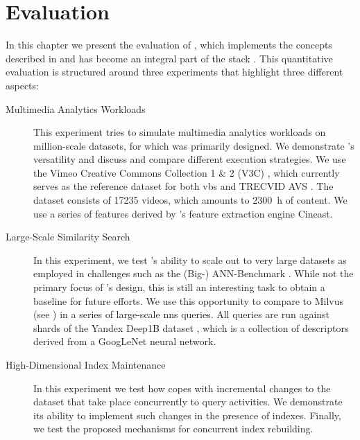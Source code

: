 \chapter{Evaluation}
\label{chapter:evaluation}

In this chapter we present the evaluation of \cottontail{} \cite{Gasser:2020Cottontail}, which implements the concepts described in  and has become an integral part of the \vitrivr{} stack \cite{Rossetto:2016Vitrivr,Gasser:2019Towards,Gasser:2019Multimodal}. This quantitative evaluation is structured around three experiments that highlight three different aspects:

\begin{description}
    \item[Multimedia Analytics Workloads] This experiment tries to simulate multimedia analytics workloads on million-scale datasets, for which \cottontail{} was primarily designed. We demonstrate \cottontail{}'s versatility and discuss and compare different execution strategies. We use the Vimeo Creative Commons Collection 1 \& 2 (V3C) \cite{Berns:2019V3C1,Rossetto:2021Insights}, which currently serves as the reference dataset for both \acrshort{vbs} \cite{Schoeffmann:2019Video} and TRECVID AVS \cite{Chen:2021What}. The dataset consists of  \SI{17235}{} videos, which amounts to \SI{2300}{\hour} of content. We use a series of features derived by \vitrivr{}'s feature extraction engine Cineast.
    \item[Large-Scale Similarity Search] In this experiment, we test \cottontail{}'s ability to scale out to very large datasets as employed in challenges such as the (Big-) ANN-Benchmark \cite{Aumueller:2017ANN,Simhadri:2022Results}. While not the primary focus of \cottontail{}'s design, this is still an interesting task to obtain a baseline for future efforts. We use this opportunity to compare \cottontail{} to Milvus (see ) in a series of large-scale \acrshort{nns} queries. All queries are run against shards of the Yandex Deep1B dataset \cite{Babenko:2016Efficient}, which is a collection of descriptors derived from a GoogLeNet \cite{Szegedy:2015Going} neural network.
    \item[High-Dimensional Index Maintenance] In this experiment we test how \cottontail{} copes with incremental changes to the dataset that take place concurrently to query activities. We demonstrate its ability to implement such changes in the presence of indexes. Finally, we test the proposed mechanisms for concurrent index rebuilding.
\end{description}

